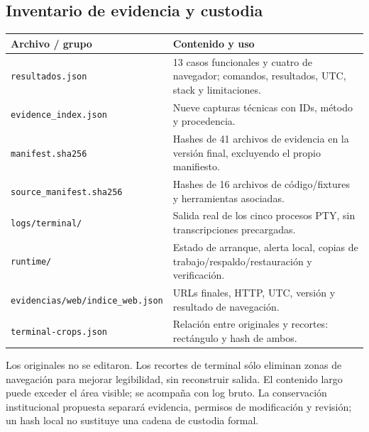 \documentclass[10pt,a4paper]{article}
\newcommand{\archivo}[1]{{\ttfamily\nolinkurl{#1}}}
\newcommand{\cabecera}[1]{\textbf{#1}}
\begin{document}
\subsection*{Inventario de evidencia y custodia}
\begin{tabularx}{\linewidth}{P{48mm}Y}
\toprule\cabecera{Archivo / grupo} & \cabecera{Contenido y uso}\\\midrule
\archivo{resultados.json} & 13 casos funcionales y cuatro de navegador; comandos, resultados, UTC, stack y limitaciones.\\
\archivo{evidence_index.json} & Nueve capturas técnicas con IDs, método y procedencia.\\
\archivo{manifest.sha256} & Hashes de 41 archivos de evidencia en la versión final, excluyendo el propio manifiesto.\\
\archivo{source_manifest.sha256} & Hashes de 16 archivos de código/fixtures y herramientas asociadas.\\
\archivo{logs/terminal/} & Salida real de los cinco procesos PTY, sin transcripciones precargadas.\\
\archivo{runtime/} & Estado de arranque, alerta local, copias de trabajo/respaldo/restauración y verificación.\\
\archivo{evidencias/web/indice_web.json} & URLs finales, HTTP, UTC, versión y resultado de navegación.\\
\archivo{terminal-crops.json} & Relación entre originales y recortes: rectángulo y hash de ambos.\\\bottomrule
\end{tabularx}
Los originales no se editaron. Los recortes de terminal sólo eliminan zonas de navegación para mejorar legibilidad, sin reconstruir salida. El contenido largo puede exceder el área visible; se acompaña con log bruto. La conservación institucional propuesta separará evidencia, permisos de modificación y revisión; un hash local no sustituye una cadena de custodia formal.
\end{document}
